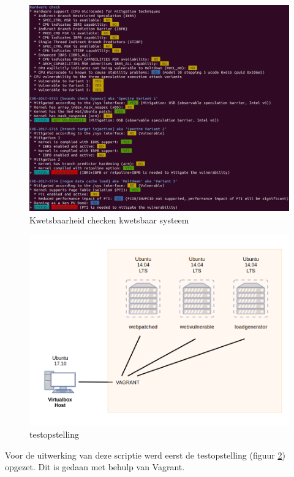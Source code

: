 \begin{figure}
	\includegraphics[width=1.0\linewidth]{img/checker_vulnerable.png}
	\caption{Kwetsbaarheid checken kwetsbaar systeem}
	\label{fig:checker_vulnerable}
\end{figure}

\begin{figure}
	\includegraphics[width=1.0\linewidth]{img/testopstelling.png}
	\caption{testopstelling}
	\label{fig:testopstelling}
\end{figure}

Voor de uitwerking van deze scriptie werd eerst de testopstelling (figuur \ref{fig:testopstelling}) opgezet.
Dit is gedaan met behulp van Vagrant.


